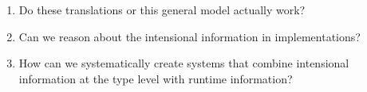 \documentclass[xetex,serif,mathserif,aspectratio=169]{beamer}
\begin{document}

\begin{frame}

  \begin{enumerate}
  \item Do these translations or this general model actually work?

    \bigskip
  \item Can we reason about the intensional information in
    implementations?


    \bigskip
  \item How can we systematically create systems that combine
    intensional information at the type level with runtime
    information?


  \end{enumerate}
\end{frame}
\end{document}
